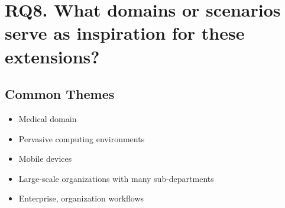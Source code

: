 \documentclass[letterpaper,10pt,english]{sphinxmanual}
\begin{document}
\chapter{RQ8. What domains or scenarios serve as inspiration for these extensions?}
\label{research_questions/RQ_8:rq8-what-domains-or-scenarios-serve-as-inspiration-for-these-extensions}\label{research_questions/RQ_8::doc}

\section{Common Themes}
\label{research_questions/RQ_8:common-themes}\begin{itemize}
\item {} 
Medical domain

\item {} 
Pervasive computing environments

\item {} 
Mobile devices

\item {} 
Large-scale organizations with many sub-departments

\item {} 
Enterprise, organization workflows

\end{itemize}
\end{document}
